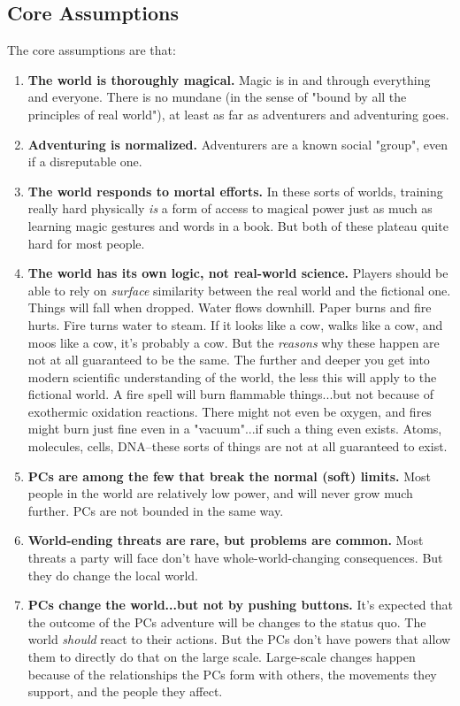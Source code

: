 \subsection{Core Assumptions}
The core assumptions are that:
\begin{enumerate}
\item \textbf{The world is thoroughly magical.} Magic is in and through everything and everyone. There is no mundane (in the sense of "bound by all the principles of real world"), at least as far as adventurers and adventuring goes.
\item \textbf{Adventuring is normalized.} Adventurers are a known social "group", even if a disreputable one.
\item \textbf{The world responds to mortal efforts.} In these sorts of worlds, training really hard physically \textit{is} a form of access to magical power just as much as learning magic gestures and words in a book. But both of these plateau quite hard for most people.
\item \textbf{The world has its own logic, not real-world science.} Players should be able to rely on \textit{surface} similarity between the real world and the fictional one. Things will fall when dropped. Water flows downhill. Paper burns and fire hurts. Fire turns water to steam. If it looks like a cow, walks like a cow, and moos like a cow, it's probably a cow. But the \textit{reasons} why these happen are not at all guaranteed to be the same. The further and deeper you get into modern scientific understanding of the world, the less this will apply to the fictional world. A fire spell will burn flammable things...but not because of exothermic oxidation reactions. There might not even be oxygen, and fires might burn just fine even in a "vacuum"...if such a thing even exists. Atoms, molecules, cells, DNA--these sorts of things are not at all guaranteed to exist.
\item \textbf{PCs are among the few that break the normal (soft) limits.} Most people in the world are relatively low power, and will never grow much further. PCs are not bounded in the same way.
\item \textbf{World-ending threats are rare, but problems are common.} Most threats a party will face don't have whole-world-changing consequences. But they do change the local world.
\item \textbf{PCs change the world...but not by pushing buttons.} It's expected that the outcome of the PCs adventure will be changes to the status quo. The world \textit{should} react to their actions. But the PCs don't have powers that allow them to directly do that on the large scale. Large-scale changes happen because of the relationships the PCs form with others, the movements they support, and the people they affect.

\end{enumerate}
